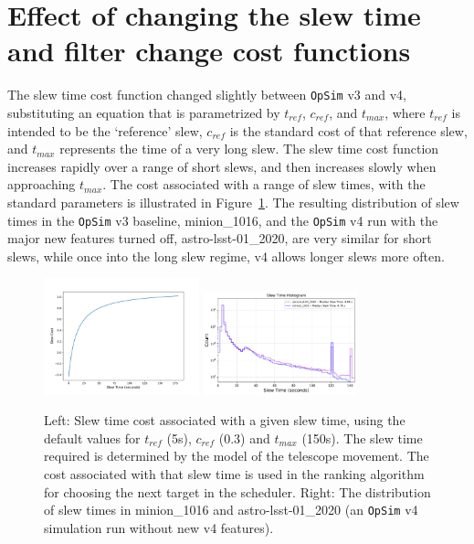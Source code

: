 \documentclass[DM,lsstdraft,authoryear,toc]{lsstdoc}
\newcommand{\opsim}{\texttt{OpSim}\xspace}
\begin{document}
\section{Effect of changing the slew time and filter change cost functions}

The slew time cost function changed slightly between \opsim v3 and v4, substituting an equation that is parametrized by $t_{ref}$, $c_{ref}$, and $t_{max}$, where $t_{ref}$ is intended to be the `reference' slew, $c_{ref}$ is the standard cost of that reference slew, and $t_{max}$ represents the time of a very long slew. The slew time cost function increases rapidly over a range of short slews, and then increases slowly when approaching $t_{max}$.  The cost associated with a range of slew times, with the standard parameters is illustrated in Figure~\ref{fig:slewcost}.  The resulting distribution of slew times in the \opsim v3 baseline, minion\_1016, and the \opsim v4 run with the major new features turned off, astro-lsst-01\_2020, are very similar for short slews, while once into the long slew regime, v4 allows longer slews more often.

\begin{figure}[ht]
\centering
\includegraphics[width=0.4\textwidth]{figures/slewcost}
\includegraphics[width=0.4\textwidth]{figures/slewtimes}
\caption{Left: Slew time cost associated with a given slew time, using the default values for $t_{ref}$ (5s), $c_{ref}$ (0.3) and $t_{max}$ (150s). The slew time required is determined by the model of the telescope movement. The cost associated with that slew time is used in the ranking algorithm for choosing the next target in the scheduler. Right: The distribution of slew times in minion\_1016 and astro-lsst-01\_2020 (an \opsim v4 simulation run without new v4 features). 
\label{fig:slewcost}}
\end{figure}
\end{document}
